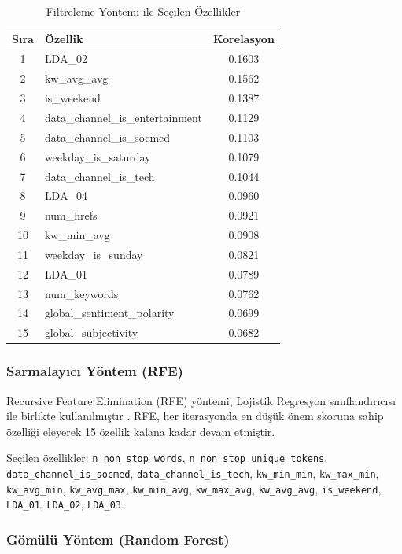 \documentclass[conference]{IEEEtran}
\begin{document}
\begin{table}[H]
\centering
\caption{Filtreleme Yöntemi ile Seçilen Özellikler}
\label{tab:filter_features}
\begin{tabular}{clc}
\toprule
\textbf{Sıra} & \textbf{Özellik} & \textbf{Korelasyon} \\
\midrule
1 & LDA\_02 & 0.1603 \\
2 & kw\_avg\_avg & 0.1562 \\
3 & is\_weekend & 0.1387 \\
4 & data\_channel\_is\_entertainment & 0.1129 \\
5 & data\_channel\_is\_socmed & 0.1103 \\
6 & weekday\_is\_saturday & 0.1079 \\
7 & data\_channel\_is\_tech & 0.1044 \\
8 & LDA\_04 & 0.0960 \\
9 & num\_hrefs & 0.0921 \\
10 & kw\_min\_avg & 0.0908 \\
11 & weekday\_is\_sunday & 0.0821 \\
12 & LDA\_01 & 0.0789 \\
13 & num\_keywords & 0.0762 \\
14 & global\_sentiment\_polarity & 0.0699 \\
15 & global\_subjectivity & 0.0682 \\
\bottomrule
\end{tabular}
\end{table}

\subsubsection{Sarmalayıcı Yöntem (RFE)}

Recursive Feature Elimination (RFE) yöntemi, Lojistik Regresyon sınıflandırıcısı ile birlikte kullanılmıştır \cite{guyon2002gene}. RFE, her iterasyonda en düşük önem skoruna sahip özelliği eleyerek 15 özellik kalana kadar devam etmiştir.

Seçilen özellikler: \texttt{n\_non\_stop\_words}, \texttt{n\_non\_stop\_unique\_tokens}, \texttt{data\_channel\_is\_socmed}, \texttt{data\_channel\_is\_tech}, \texttt{kw\_min\_min}, \texttt{kw\_max\_min}, \texttt{kw\_avg\_min}, \texttt{kw\_avg\_max}, \texttt{kw\_min\_avg}, \texttt{kw\_max\_avg}, \texttt{kw\_avg\_avg}, \texttt{is\_weekend}, \texttt{LDA\_01}, \texttt{LDA\_02}, \texttt{LDA\_03}.

\subsubsection{Gömülü Yöntem (Random Forest)}
\end{document}
